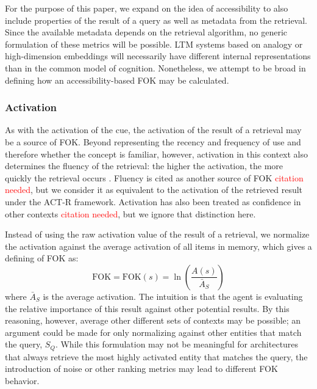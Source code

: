\documentclass[10pt,letterpaper]{article}
\newcommand{\fixme}[2][]{#2}
\renewcommand{\fixme}[2][]{\textcolor{red}{#2}}
\newcommand{\fok}[0]{\text{FOK}}
\begin{document}
For the purpose of this paper, we expand on the idea of accessibility to also include properties of the result of a query as well as metadata from the retrieval.
Since the available metadata depends on the retrieval algorithm, no generic formulation of these metrics will be possible.
LTM systems based on analogy \cite{Forbus1995MACFACAModel} or high-dimension embeddings \cite{Kanerva1993SparseDistributedMemory} will necessarily have different internal representations than in the common model of cognition.
Nonetheless, we attempt to be broad in defining how an accessibility-based FOK may be calculated.

\subsubsection{Activation}

As with the activation of the cue, the activation of the result of a retrieval may be a source of FOK.
Beyond representing the recency and frequency of use and therefore whether the concept is familiar, however, activation in this context also determines the fluency of the retrieval: the higher the activation, the more quickly the retrieval occurs \cite{Anderson2004AnIntegratedTheory}.
Fluency is cited as another source of FOK \fixme{citation needed}, but we consider it as equivalent to the activation of the retrieved result under the ACT-R framework.
Activation has also been treated as confidence in other contexts \fixme{citation needed}, but we ignore that distinction here.

Instead of using the raw activation value of the result of a retrieval, we normalize the activation against the average activation of all items in memory, which gives a defining of FOK as:
$$\fok = \fok(s) = \ln(\frac{A(s)}{\bar{A}_S})$$
where $\bar{A}_S$ is the average activation. %
The intuition is that the agent is evaluating the relative importance of this result against other potential results.
By this reasoning, however, average other different sets of contexts may be possible; an argument could be made for only normalizing against other entities that match the query, $S_Q$.
While this formulation may not be meaningful for architectures that always retrieve the most highly activated entity that matches the query, the introduction of noise or other ranking metrics may lead to different FOK behavior.

% 
% 
\end{document}
